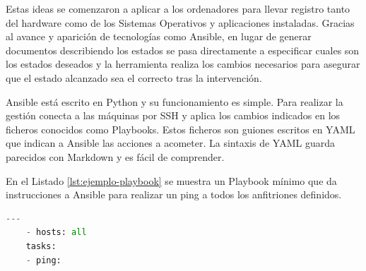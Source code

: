Estas ideas se comenzaron a aplicar a los ordenadores para llevar registro tanto del hardware como de los Sistemas Operativos y aplicaciones instaladas. Gracias al avance y aparición de tecnologías como Ansible, en lugar de generar documentos describiendo los estados se pasa directamente a especificar cuales son los estados deseados y la herramienta realiza los cambios necesarios para asegurar que el estado alcanzado sea el correcto tras la intervención.

Ansible está escrito en Python y su funcionamiento es simple. Para realizar la gestión conecta a las máquinas por SSH y aplica los cambios indicados en los ficheros conocidos como Playbooks. Estos ficheros son guiones escritos en YAML que indican a Ansible las acciones a acometer. La sintaxis de YAML guarda parecidos con Markdown y es fácil de comprender.

En el Listado \ref{lst:ejemplo-playbook} se muestra un Playbook mínimo que da instrucciones a Ansible para realizar un ping a todos los anfitriones definidos.

\begin{lstlisting}[language=Python,caption={Ejemplo mínimo de Playbook},label=lst:ejemplo-playbook]
    ---
    - hosts: all
    tasks:
    - ping:
\end{lstlisting}